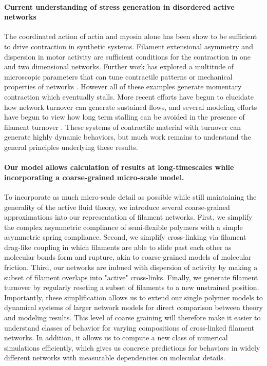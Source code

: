 \documentclass[10pt,letterpaper]{article}
\begin{document}
\paragraph{Current understanding of stress generation in disordered active networks }

The coordinated action of actin and myosin alone has been show to be sufficient to drive contraction in synthetic systems\cite{rheo_2D1}.  Filament extensional asymmetry and dispersion in motor activity are sufficient conditions for the contraction in one \cite{1367-2630-14-3-033037} and two \cite{PhysRevX.4.041002} dimensional networks.  Further work has explored a multitude of microscopic parameters that can tune contractile patterns \cite{10.1371/journal.pone.0039869,Alvarado:2013aa,C0SM00494D} or mechanical properties of networks \cite{0295-5075-85-1-18007,rheo_active}.  However all of these examples generate momentary contraction which eventually stalls.  More recent efforts have begun to elucidate how network turnover can generate sustained flows\cite{10.1371/journal.pone.0000696}, and several modeling efforts have begun to view how long term stalling can be avoided in the presence of filament turnover \cite{2015arXiv150706182H,Mak:2016aa}. These systems of contractile material with turnover can generate highly dynamic behaviors\cite{PhysRevLett.113.148102}, but much work remains to understand the general principles underlying these results.

\paragraph{Our model allows calculation of results at long-timescales while incorporating a coarse-grained micro-scale model.}  
To incorporate as much micro-scale detail as possible while still maintaining the generality of the active fluid theory, we introduce several coarse-grained approximations into our representation of filament networks.  First, we simplify the complex asymmetric compliance of semi-flexible polymers with a simple asymmetric spring compliance.  Second, we simplify cross-linking via filament drag-like coupling in which filaments are able to slide past each other as molecular bonds form and rupture, akin to coarse-grained models of molecular friction\cite{theo_friction,theo_frictionSam,theo_molefric}.  Third, our networks are imbued with dispersion of activity by making a subset of filament overlaps into "active" cross-links\cite{theo_frictionShila}.  Finally, we generate filament turnover by regularly reseting a subset of filaments to a new unstrained position.  Importantly, these simplification allows us to extend our single polymer models to dynamical systems of larger network models for direct comparison between theory and modeling results.  This level of coarse graining will therefore make it easier to understand classes of behavior for varying compositions of cross-linked filament networks.  In addition, it allows us to compute a new class of numerical simulations efficiently, which gives us concrete predictions for behaviors in widely different networks with measurable dependencies on molecular details.
\end{document}
